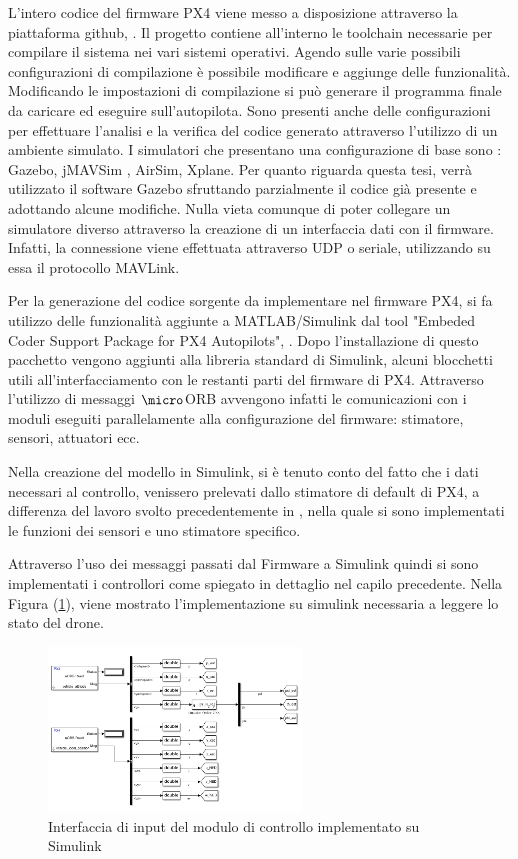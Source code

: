 L'intero codice del firmware PX4 viene messo a disposizione attraverso la piattaforma github, \cite{PX4FIRMWARE}. Il progetto contiene all'interno le toolchain necessarie per compilare il sistema nei vari sistemi operativi. Agendo sulle varie possibili configurazioni di compilazione è possibile modificare e aggiunge delle funzionalità. Modificando le impostazioni di compilazione si può generare il programma finale da caricare ed eseguire sull'autopilota.
Sono presenti anche delle configurazioni per effettuare l'analisi e la verifica del codice generato attraverso l'utilizzo di un ambiente simulato. I simulatori che presentano una configurazione di base sono : Gazebo, jMAVSim , AirSim, Xplane. Per quanto riguarda questa tesi, verrà utilizzato il software Gazebo sfruttando parzialmente il codice già presente e adottando alcune modifiche. Nulla vieta comunque di poter collegare un simulatore diverso attraverso la creazione di un interfaccia dati con il firmware. Infatti, la connessione viene effettuata attraverso UDP o seriale, utilizzando su essa il protocollo MAVLink.

Per la generazione del codice sorgente da implementare nel firmware PX4, si fa utilizzo delle funzionalità aggiunte a MATLAB/Simulink dal tool "Embeded Coder Support Package for PX4 Autopilots", \cite{PX4MATLAB}. Dopo l'installazione di questo pacchetto vengono aggiunti alla libreria standard di Simulink, alcuni blocchetti utili all'interfacciamento con le restanti parti del firmware di PX4. Attraverso l'utilizzo di messaggi $\micro$ORB avvengono infatti le comunicazioni con i moduli eseguiti parallelamente alla configurazione del firmware: stimatore, sensori, attuatori ecc.

Nella creazione del modello in Simulink, si è tenuto conto del fatto che i dati necessari al controllo, venissero prelevati dallo stimatore di default di PX4, a differenza del lavoro svolto precedentemente in \cite{DesTestCarm}, nella quale si sono implementati le funzioni dei sensori e uno stimatore specifico.

Attraverso l'uso dei messaggi passati dal Firmware a Simulink quindi si sono implementati i controllori come spiegato in dettaglio nel capilo precedente. Nella Figura (\ref{fig:in}), viene mostrato l'implementazione su simulink necessaria a leggere lo stato del drone.

\begin{figure}
	\centering
	\includegraphics[width=0.6\textwidth]{DescrizioneAutopilota/Figure/IN}
	\caption{Interfaccia di input del modulo di controllo implementato su Simulink}
	\label{fig:in}
\end{figure}

